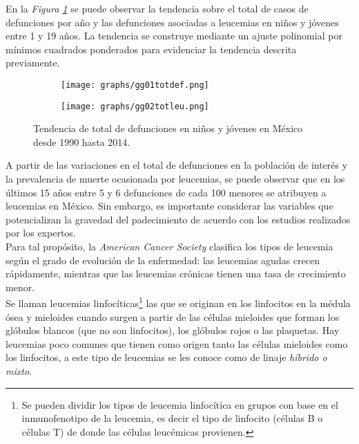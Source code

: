 \documentclass[11pt, oneside]{book}
\begin{document}
En la \emph{Figura \ref{fig1y2.anio}} se puede observar la tendencia sobre el total de casos de defunciones por año y las defunciones asociadas a leucemias en niños y jóvenes entre 1 y 19 años. La tendencia se construye mediante un ajuste polinomial por mínimos cuadrados ponderados para evidenciar la tendencia descrita previamente.\\

\begin{figure}[ht]
	\begin{subfigure}{.5\textwidth}
	  \centering
	  \texttt{[image: graphs/gg01totdef.png]}
	\end{subfigure}%
	\begin{subfigure}{.5\textwidth}
	  \centering
    \texttt{[image: graphs/gg02totleu.png]}
	\end{subfigure}
  \caption{Tendencia de total de defunciones en niños y jóvenes en México desde 1990 hasta 2014.}
  \label{fig1y2.anio}
\end{figure}

A partir de las variaciones en el total de defunciones en la población de interés y la prevalencia de muerte ocasionada por leucemias, se puede observar que en los últimos 15 años entre 5 y 6 defunciones de cada 100 menores se atribuyen a leucemias en México. Sin embargo, es importante considerar las variables que potencializan la gravedad del padecimiento de acuerdo con los estudios realizados por los expertos.\\   

Para tal propósito, la \emph{American Cancer Society} clasifica los tipos de leucemia según el grado de evolución de la enfermedad: las leucemias agudas crecen rápidamente, mientras que las leucemias crónicas tienen una tasa de crecimiento menor.\\ 

Se llaman leucemias linfocíticas\footnote{Se pueden dividir los tipos de leucemia linfocítica en grupos con base en el inmunofenotipo de la leucemia, es decir el tipo de linfocito (células B o células T) de donde las células leucémicas provienen.} las que se originan en los linfocitos en la médula ósea y mieloides cuando surgen a partir de las células mieloides que forman los glóbulos blancos (que no son linfocitos), los glóbulos rojos o las plaquetas. Hay leucemias poco comunes que tienen como origen tanto las células mieloides como los linfocitos, a este tipo de leucemias se les conoce como de linaje \emph{híbrido o mixto}.\\
\end{document}
